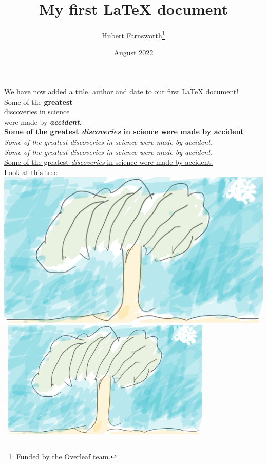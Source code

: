\documentclass[12pt, letterpaper]{article}
\title{My first LaTeX document}
\author{Hubert Farnsworth\thanks{Funded by the Overleaf team.}}
\date{August 2022}
\begin{document}
            \maketitle
            We have now added a title, author and date to our first \LaTeX{} document!
            \\Some of the \textbf{greatest}
            \\discoveries in \underline{science} 
            \\were made by \textbf{\textit{accident}}.
            \\\textbf{Some of the greatest \emph{discoveries} in science were made by accident}
            \\\textit{Some of the greatest \emph{discoveries} in science were made by accident.}
            \\\textit{Some of the greatest \emph{discoveries} in science were made by accident.}
            \\\underline{Some of the greatest \emph{discoveries} in science were made by accident.}
            \\Look at this tree
            \centering
            \\\includegraphics[width=1\textwidth]{tree.png}
            \centering
            \\\ \includegraphics[width=0.75\textwidth]{tree.png}
\end{document}
